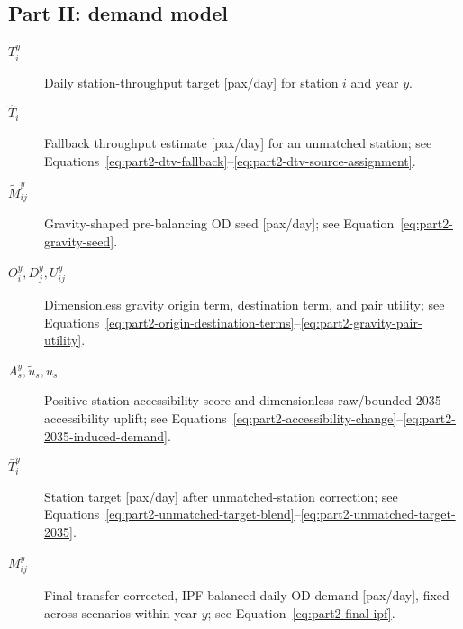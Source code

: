 \documentclass[preprint,12pt]{elsarticle}
\begin{document}
\subsection*{Part II: demand model}
\begin{description}
    \item[$T_i^y$] Daily station-throughput target [pax/day] for station \(i\) and year \(y\).
    \item[$\widehat T_i$] Fallback throughput estimate [pax/day] for an unmatched station; see Equations~\eqref{eq:part2-dtv-fallback}--\eqref{eq:part2-dtv-source-assignment}.
    \item[$\widetilde M_{ij}^y$] Gravity-shaped pre-balancing OD seed [pax/day]; see Equation~\eqref{eq:part2-gravity-seed}.
    \item[$O_i^y,D_j^y,U_{ij}^y$] Dimensionless gravity origin term, destination term, and pair utility; see Equations~\eqref{eq:part2-origin-destination-terms}--\eqref{eq:part2-gravity-pair-utility}.
    \item[$A_s^y,\widetilde u_s,u_s$] Positive station accessibility score and dimensionless raw/bounded 2035 accessibility uplift; see Equations~\eqref{eq:part2-accessibility-change}--\eqref{eq:part2-2035-induced-demand}.
    \item[$\bar T_i^y$] Station target [pax/day] after unmatched-station correction; see Equations~\eqref{eq:part2-unmatched-target-blend}--\eqref{eq:part2-unmatched-target-2035}.
    \item[$M_{ij}^y$] Final transfer-corrected, IPF-balanced daily OD demand [pax/day], fixed across scenarios within year \(y\); see Equation~\eqref{eq:part2-final-ipf}.
\end{description}
\end{document}
